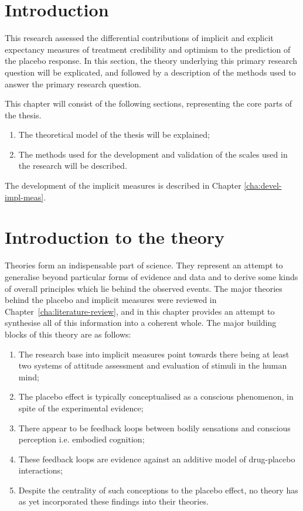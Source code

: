 
\section{Introduction}

This research assessed the differential contributions of implicit and explicit expectancy measures of treatment credibility and optimism to the prediction of the placebo response. 
In this section, the theory underlying this primary research question will be explicated, and followed by a description of the methods used to answer the primary research question. 


This chapter will consist of the following sections, representing the core parts of the thesis.

\begin{enumerate}
\item The theoretical model of the thesis will be explained;
\item The methods used for the development and validation of the scales used in the research will be described.
\end{enumerate}

The development of the implicit measures is described in Chapter \ref{cha:devel-impl-meas}. 

\section{Introduction to the theory}

Theories form an indispensable part of science. They represent an attempt to generalise beyond particular forms of evidence and data and to derive some kinds of overall principles which lie behind the observed events. The major theories behind the placebo and implicit measures were reviewed in  Chapter~\ref{cha:literature-review}, and in this chapter provides  an attempt to synthesise all of this information into a coherent whole. The major building blocks of this theory are as follows:
\begin{enumerate}
\item The research base into implicit measures point towards there being at least two systems of attitude assessment and evaluation of stimuli in the human mind;%
\item The placebo effect is typically conceptualised as a conscious phenomenon, in spite of the experimental evidence;
\item There appear to be feedback loops between bodily sensations and conscious perception i.e. embodied cognition;
\item These feedback loops are evidence against an additive model of drug-placebo interactions;
\item Despite the centrality of such conceptions to the placebo effect, no theory has as yet incorporated these findings into their theories.
\end{enumerate}

